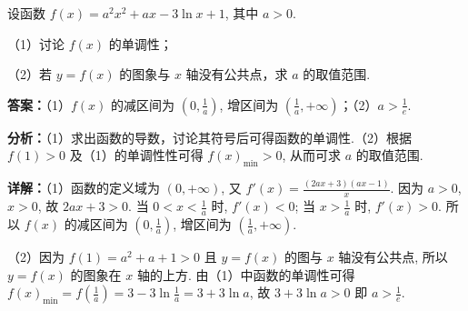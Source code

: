 \begin{question}[points=12]
设函数 $f(x) = a^2 x^2 + ax - 3\ln x + 1$, 其中 $a>0$.



（1）讨论 $f(x)$ 的单调性；



（2）若 $y=f(x)$ 的图象与 $x$ 轴没有公共点，求 $a$ 的取值范围.
\begin{solution}
\textbf{答案：}（1）$f(x)$ 的减区间为 $\left(0, \frac{1}{a}\right)$, 增区间为 $\left(\frac{1}{a}, +\infty\right)$；（2）$a > \frac{1}{e}$.

\textbf{分析：}（1）求出函数的导数，讨论其符号后可得函数的单调性.（2）根据 $f(1)>0$ 及（1）的单调性性可得 $f(x)_{\min} > 0$, 从而可求 $a$ 的取值范围.

\textbf{详解：}（1）函数的定义域为 $(0, +\infty)$, 又 $f'(x) = \frac{(2ax+3)(ax-1)}{x}$. 因为 $a>0$, $x>0$, 故 $2ax+3>0$. 当 $0 < x < \frac{1}{a}$ 时, $f'(x) < 0$; 当 $x > \frac{1}{a}$ 时, $f'(x) > 0$. 所以 $f(x)$ 的减区间为 $\left(0, \frac{1}{a}\right)$, 增区间为 $\left(\frac{1}{a}, +\infty\right)$.

（2）因为 $f(1)=a^2+a+1>0$ 且 $y=f(x)$ 的图与 $x$ 轴没有公共点, 所以 $y=f(x)$ 的图象在 $x$ 轴的上方. 由（1）中函数的单调性可得 $f(x)_{\min} = f\left(\frac{1}{a}\right) = 3 - 3\ln\frac{1}{a} = 3 + 3\ln a$, 故 $3+3\ln a > 0$ 即 $a > \frac{1}{e}$.
\end{solution}
\end{question}

